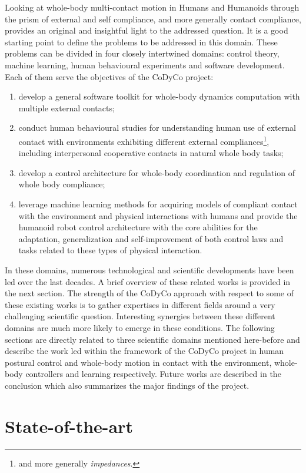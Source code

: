 \documentclass[final,5p,twocolumn]{elsarticle}
\begin{document}
Looking at whole-body multi-contact motion in Humans and Humanoids through the prism of external and self compliance, and more generally contact compliance, provides an original and insightful light to the addressed question. It is a good starting point to define the problems to be addressed in this domain. These problems can be divided in four closely intertwined domains: control theory, machine learning, human behavioural experiments and software development. Each of them serve the objectives of the CoDyCo project:
\begin{enumerate}
\item develop a general software toolkit for whole-body dynamics computation with multiple external contacts;
\item conduct human behavioural studies for understanding human use of external contact with environments exhibiting different external compliances\footnote{and more generally \textit{impedances}.}, including interpersonal cooperative contacts in natural whole body tasks;
\item develop a control architecture for whole-body coordination and regulation of whole body compliance;
\item leverage machine learning methods for acquiring models of compliant contact with the environment and physical interactions with humans and provide the humanoid robot control architecture with the core abilities for the adaptation, generalization and self-improvement of both control laws and tasks related to these types of physical interaction.
\end{enumerate}

In these domains, numerous technological and scientific developments have been led over the last decades. A brief overview of these related works is provided in the next section. The strength of the CoDyCo approach with respect to some of these existing works is to gather expertises in different fields around a very challenging scientific question. Interesting synergies between these different domains are much more likely to  emerge in these conditions. The following sections are directly related to three scientific domains mentioned here-before and describe the work led within the framework of the CoDyCo project in human postural control and whole-body motion in contact with the environment, whole-body controllers and learning respectively. Future works are described in the conclusion which also summarizes the major findings of the project.

\section{State-of-the-art}
\end{document}
